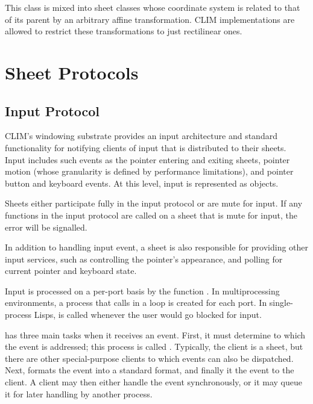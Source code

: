 
This class is mixed into sheet classes whose coordinate system is related to
that of its parent by an arbitrary affine transformation.  CLIM implementations
are allowed to restrict these transformations to just rectilinear ones.


\chapter {Sheet Protocols}
\label {sheet-protocols}

\section {Input Protocol}

CLIM's windowing substrate provides an input architecture and standard
functionality for notifying clients of input that is distributed to their
sheets.  Input includes such events as the pointer entering and exiting sheets,
pointer motion (whose granularity is defined by performance limitations), and
pointer button and keyboard events.  At this level, input is represented as
 objects.

Sheets either participate fully in the input protocol or are mute for input.  If
any functions in the input protocol are called on a sheet that is mute for
input, the  error will be signalled.

In addition to handling input event, a sheet is also responsible for providing
other input services, such as controlling the pointer's appearance, and polling
for current pointer and keyboard state.

Input is processed on a per-port basis by the function .
In multiprocessing environments, a process that calls  in a
loop is created for each port.  In single-process Lisps, 
is called whenever the user would go blocked for input.

 has three main tasks when it receives an event.  First,
it must determine to which  the event is addressed; this process
is called .  Typically, the client is a sheet, but there
are other special-purpose clients to which events can also be dispatched.  Next,
 formats the event into a standard format, and finally it
 the event to the client.  A client may then either handle
the event synchronously, or it may queue it for later handling by another
process.

